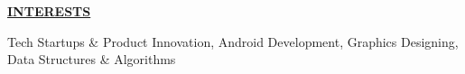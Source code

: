 \documentclass[a4paper]{deedy-resume} %
\begin{document}







\sectionspace

{\uppercase\uline{\textbf{\large{INTERESTS}}\hfill}}

\microspace
Tech Startups \& Product Innovation, Android Development, Graphics Designing, Data Structures \& Algorithms
\minispace
\end{document}

